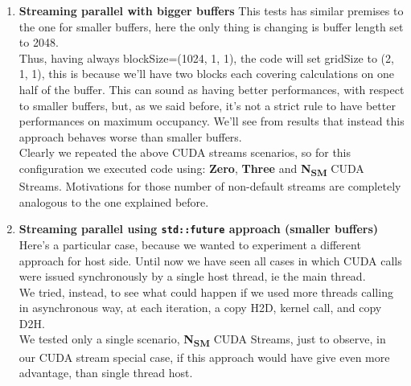 \begin{enumerate}
	\item \textbf{Streaming parallel with bigger buffers}
	This tests has similar premises to the one for smaller buffers, here the only thing is changing is buffer length set to 2048.\\
	Thus, having always blockSize=(1024, 1, 1), the code will set gridSize to (2, 1, 1), this is because we'll have two blocks each covering calculations on one half of the buffer.
	This can sound as having better performances, with respect to smaller buffers, but, as we said before, it's not a strict rule to have better performances on maximum occupancy.
	We'll see from results that instead this approach behaves worse than smaller buffers. \\
	Clearly we repeated the above CUDA streams scenarios, so for this configuration we executed code using: \textbf{Zero}, \textbf{Three} and \textbf{N\textsubscript{SM}} CUDA Streams.
	Motivations for those number of non-default streams are completely analogous to the one explained before.

	\item \textbf{Streaming parallel using \texttt{std::future} approach (smaller buffers)}
	Here's a particular case, because we wanted to experiment a different approach for host side.
	Until now we have seen all cases in which CUDA calls were issued synchronously by a single host thread, ie the main thread.\\
	We tried, instead, to see what could happen if we used more threads calling in asynchronous way, at each iteration, a copy H2D, kernel call, and copy D2H.\\
	We tested only a single scenario, \textbf{N\textsubscript{SM}} CUDA Streams, just to observe, in our CUDA stream special case, if this approach would have give even more advantage, than single thread host.
	
\end{enumerate}

